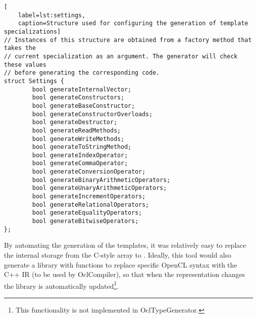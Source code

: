 \begin{lstlisting}[
	label=lst:settings, 
	caption=Structure used for configuring the generation of template specializations]
// Instances of this structure are obtained from a factory method that takes the 
// current specialization as an argument. The generator will check these values 
// before generating the corresponding code.
struct Settings {
		bool generateInternalVector;
		bool generateConstructors;
		bool generateBaseConstructor;
		bool generateConstructorOverloads;
		bool generateDestructor;
		bool generateReadMethods;
		bool generateWriteMethods;
		bool generateToStringMethod;
		bool generateIndexOperator;
		bool generateCommaOperator;
		bool generateConversionOperator;
		bool generateBinaryArithmeticOperators;
		bool generateUnaryArithmeticOperators;
		bool generateIncrementOperators;
		bool generateRelationalOperators;
		bool generateEqualityOperators;
		bool generateBitwiseOperators;
};
\end{lstlisting}

By automating the generation of the templates, it was relatively easy to replace the internal storage from the C-style array to \vectype{}. Ideally, this tool would also generate a library with functions to replace specific OpenCL syntax with the C++ IR (to be used by OclCompiler), so that when the representation changes the library is automatically updated\footnote{This functionality is not implemented in OclTypeGenerator.}.